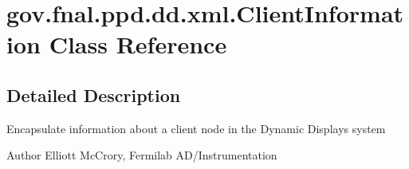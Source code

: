 \hypertarget{classgov_1_1fnal_1_1ppd_1_1dd_1_1xml_1_1ClientInformation}{\section{gov.\-fnal.\-ppd.\-dd.\-xml.\-Client\-Information Class Reference}
\label{classgov_1_1fnal_1_1ppd_1_1dd_1_1xml_1_1ClientInformation}
}


\subsection{Detailed Description}
Encapsulate information about a client node in the Dynamic Displays system

\begin{DoxyAuthor}{Author}
Elliott Mc\-Crory, Fermilab A\-D/\-Instrumentation 
\end{DoxyAuthor}
